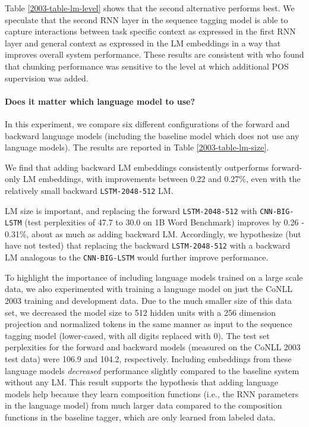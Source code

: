 \documentclass[11pt,a4paper]{article}
\begin{document}
Table \ref{2003-table-lm-level} shows that the second alternative
performs best.
We speculate that the second RNN layer in the sequence tagging
model is able to capture interactions between task specific context as
expressed in the first RNN layer and general context as expressed in the LM
embeddings in a way that improves overall
system performance.  These results are consistent with \citet{Sgaard2016DeepML} who found that chunking performance was sensitive
to the level at which additional POS supervision was added.





\paragraph{Does it matter which language model to use?} In this experiment, we compare six different configurations of the forward and backward language models (including the baseline model which does not use any language models).
The results are reported in Table \ref{2003-table-lm-size}.

We find that adding backward LM embeddings consistently outperforms forward-only LM embeddings, with  improvements between 0.22 and 0.27\%, even with the relatively small backward \texttt{LSTM-2048-512} LM.

LM size is important, and replacing the forward \texttt{LSTM-2048-512} with \texttt{CNN-BIG-LSTM} (test perplexities of 47.7 to 30.0 on 1B Word Benchmark) improves  by 0.26 - 0.31\%, about as much as adding backward LM. Accordingly, we hypothesize (but have not
tested) that replacing the backward \texttt{LSTM-2048-512} with a backward LM analogous to the
\texttt{CNN-BIG-LSTM} would further improve performance.

To highlight the importance of including language models trained on a large scale data, we also experimented
with training a language model on just the CoNLL 2003 training and development data.  Due to the much smaller size
of this data set, we decreased the model size to 512 hidden units with a 256 dimension projection and
normalized tokens in the same manner as input to the sequence tagging model (lower-cased, with all digits replaced
with 0).  The test set perplexities for the forward and backward models (measured on the CoNLL 2003 test data) were 106.9 and 104.2, respectively.  Including embeddings from these language models
\textit{decreased} performance slightly compared to the baseline system without any LM.
This result supports the hypothesis that adding language models help because they learn composition functions (i.e., the RNN parameters in the language model) from much larger data compared to the composition functions in the baseline tagger, which are only learned from labeled data.
\end{document}
